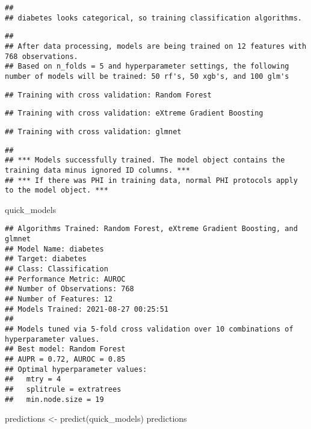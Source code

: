 \documentclass[
]{article}
\newenvironment{Shaded}{\begin{snugshade}}{\end{snugshade}}
\newcommand{\FunctionTok}[1]{\textcolor[rgb]{0.00,0.00,0.00}{#1}}
\newcommand{\NormalTok}[1]{#1}
\newcommand{\OtherTok}[1]{\textcolor[rgb]{0.56,0.35,0.01}{#1}}
\begin{document}
\begin{verbatim}
## 
## diabetes looks categorical, so training classification algorithms.
\end{verbatim}

\begin{verbatim}
## 
## After data processing, models are being trained on 12 features with 768 observations.
## Based on n_folds = 5 and hyperparameter settings, the following number of models will be trained: 50 rf's, 50 xgb's, and 100 glm's
\end{verbatim}

\begin{verbatim}
## Training with cross validation: Random Forest
\end{verbatim}

\begin{verbatim}
## Training with cross validation: eXtreme Gradient Boosting
\end{verbatim}

\begin{verbatim}
## Training with cross validation: glmnet
\end{verbatim}

\begin{verbatim}
## 
## *** Models successfully trained. The model object contains the training data minus ignored ID columns. ***
## *** If there was PHI in training data, normal PHI protocols apply to the model object. ***
\end{verbatim}

\begin{Shaded}
\begin{Highlighting}[]
\NormalTok{quick\_models}
\end{Highlighting}
\end{Shaded}

\begin{verbatim}
## Algorithms Trained: Random Forest, eXtreme Gradient Boosting, and glmnet
## Model Name: diabetes
## Target: diabetes
## Class: Classification
## Performance Metric: AUROC
## Number of Observations: 768
## Number of Features: 12
## Models Trained: 2021-08-27 00:25:51 
## 
## Models tuned via 5-fold cross validation over 10 combinations of hyperparameter values.
## Best model: Random Forest
## AUPR = 0.72, AUROC = 0.85
## Optimal hyperparameter values:
##   mtry = 4
##   splitrule = extratrees
##   min.node.size = 19
\end{verbatim}

\begin{Shaded}
\begin{Highlighting}[]
\NormalTok{predictions }\OtherTok{\textless{}{-}} \FunctionTok{predict}\NormalTok{(quick\_models)}
\NormalTok{predictions}
\end{Highlighting}
\end{Shaded}
\end{document}
